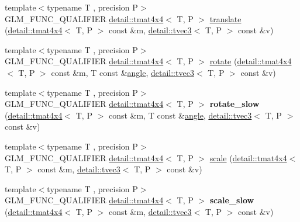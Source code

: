 \begin{DoxyCompactItemize}
\item 
{\footnotesize template$<$typename T , precision P$>$ }\\G\+L\+M\+\_\+\+F\+U\+N\+C\+\_\+\+Q\+U\+A\+L\+I\+F\+I\+ER \hyperlink{structglm_1_1detail_1_1tmat4x4}{detail\+::tmat4x4}$<$ T, P $>$ \hyperlink{group__gtc__matrix__transform_ga1501de0fa580dcc491b67e0685bbc7c2}{translate} (\hyperlink{structglm_1_1detail_1_1tmat4x4}{detail\+::tmat4x4}$<$ T, P $>$ const \&m, \hyperlink{structglm_1_1detail_1_1tvec3}{detail\+::tvec3}$<$ T, P $>$ const \&v)
\item 
{\footnotesize template$<$typename T , precision P$>$ }\\G\+L\+M\+\_\+\+F\+U\+N\+C\+\_\+\+Q\+U\+A\+L\+I\+F\+I\+ER \hyperlink{structglm_1_1detail_1_1tmat4x4}{detail\+::tmat4x4}$<$ T, P $>$ \hyperlink{group__gtc__matrix__transform_ga61e65a3bb227c267d1a15113d1056fb1}{rotate} (\hyperlink{structglm_1_1detail_1_1tmat4x4}{detail\+::tmat4x4}$<$ T, P $>$ const \&m, T const \&\hyperlink{group__gtc__quaternion_ga23a3fc7ada5bbb665ff84c92c6e0542c}{angle}, \hyperlink{structglm_1_1detail_1_1tvec3}{detail\+::tvec3}$<$ T, P $>$ const \&v)
\item 
{\footnotesize template$<$typename T , precision P$>$ }\\G\+L\+M\+\_\+\+F\+U\+N\+C\+\_\+\+Q\+U\+A\+L\+I\+F\+I\+ER \hyperlink{structglm_1_1detail_1_1tmat4x4}{detail\+::tmat4x4}$<$ T, P $>$ {\bfseries rotate\+\_\+slow} (\hyperlink{structglm_1_1detail_1_1tmat4x4}{detail\+::tmat4x4}$<$ T, P $>$ const \&m, T const \&\hyperlink{group__gtc__quaternion_ga23a3fc7ada5bbb665ff84c92c6e0542c}{angle}, \hyperlink{structglm_1_1detail_1_1tvec3}{detail\+::tvec3}$<$ T, P $>$ const \&v)\hypertarget{namespaceglm_a03bd2c89f62ae44ad3a5e5dc21effd06}{}\label{namespaceglm_a03bd2c89f62ae44ad3a5e5dc21effd06}

\item 
{\footnotesize template$<$typename T , precision P$>$ }\\G\+L\+M\+\_\+\+F\+U\+N\+C\+\_\+\+Q\+U\+A\+L\+I\+F\+I\+ER \hyperlink{structglm_1_1detail_1_1tmat4x4}{detail\+::tmat4x4}$<$ T, P $>$ \hyperlink{group__gtc__matrix__transform_gabd40959f269abd16c256a4f59ab03d62}{scale} (\hyperlink{structglm_1_1detail_1_1tmat4x4}{detail\+::tmat4x4}$<$ T, P $>$ const \&m, \hyperlink{structglm_1_1detail_1_1tvec3}{detail\+::tvec3}$<$ T, P $>$ const \&v)
\item 
{\footnotesize template$<$typename T , precision P$>$ }\\G\+L\+M\+\_\+\+F\+U\+N\+C\+\_\+\+Q\+U\+A\+L\+I\+F\+I\+ER \hyperlink{structglm_1_1detail_1_1tmat4x4}{detail\+::tmat4x4}$<$ T, P $>$ {\bfseries scale\+\_\+slow} (\hyperlink{structglm_1_1detail_1_1tmat4x4}{detail\+::tmat4x4}$<$ T, P $>$ const \&m, \hyperlink{structglm_1_1detail_1_1tvec3}{detail\+::tvec3}$<$ T, P $>$ const \&v)\hypertarget{namespaceglm_aa836cb5d035a8b96e5e9b4bb5dce0ab2}{}\label{namespaceglm_aa836cb5d035a8b96e5e9b4bb5dce0ab2}


\end{DoxyCompactItemize}
